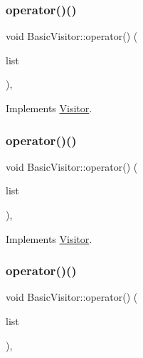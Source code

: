 \subsubsection{\texorpdfstring{operator()()}{operator()()}\hspace{0.1cm}{\footnotesize\ttfamily [54/59]}}
{\footnotesize\ttfamily void Basic\+Visitor\+::operator() (\begin{DoxyParamCaption}\item[{const \hyperlink{struct_argument_list}{Argument\+List} \&}]{list }\end{DoxyParamCaption})\hspace{0.3cm}{\ttfamily [inline]}, {\ttfamily [virtual]}}



Implements \hyperlink{struct_visitor_afe0ebb45873b49711e28f543e1be18ab}{Visitor}.

\mbox{\label{struct_basic_visitor_a210a39743aacc9903d45fe86e8aa72a5}} 
\subsubsection{\texorpdfstring{operator()()}{operator()()}\hspace{0.1cm}{\footnotesize\ttfamily [55/59]}}
{\footnotesize\ttfamily void Basic\+Visitor\+::operator() (\begin{DoxyParamCaption}\item[{const \hyperlink{struct_variable_declaration_list}{Variable\+Declaration\+List} \&}]{list }\end{DoxyParamCaption})\hspace{0.3cm}{\ttfamily [inline]}, {\ttfamily [virtual]}}



Implements \hyperlink{struct_visitor_af12d0fa756687bf6e54263bf65832663}{Visitor}.

\mbox{\label{struct_basic_visitor_a08f93ca22b6ff855deb2b1d6343123b5}} 
\subsubsection{\texorpdfstring{operator()()}{operator()()}\hspace{0.1cm}{\footnotesize\ttfamily [56/59]}}
{\footnotesize\ttfamily void Basic\+Visitor\+::operator() (\begin{DoxyParamCaption}\item[{const \hyperlink{struct_statement_list}{Statement\+List} \&}]{list }\end{DoxyParamCaption})\hspace{0.3cm}{\ttfamily [inline]}, {\ttfamily [virtual]}}




